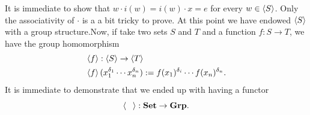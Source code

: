\begin{example}
\[  \]
  It is immediate to show that \(w \cdot i(w) = i(w) \cdot x = e\) for every
  \(w \in \left\langle S\right\rangle\). Only the associativity of \(\cdot\) is a a bit tricky
  to prove. At this point we have endowed \(\left\langle S\right\rangle\) with a group
  structure.\newline Now, if take two sets \(S\) and \(T\) and a function
  \(f : S \to T\), we have the group homomorphism
  \begin{align*}
    & \left\langle f\right\rangle : \left\langle S\right\rangle \to \left\langle T\right\rangle \\
    & \left\langle f\right\rangle (x_1^{\delta_1} \cdots x_n^{\delta_n}) := f(x_1)^{\delta_i} \cdots f(x_n)^{\delta_n} .
  \end{align*}
  It is immediate to demonstrate that we ended up with having a functor
  \[
    \angled{\phantom\square} : \Set \to \Grp .
  \]
\end{example}


